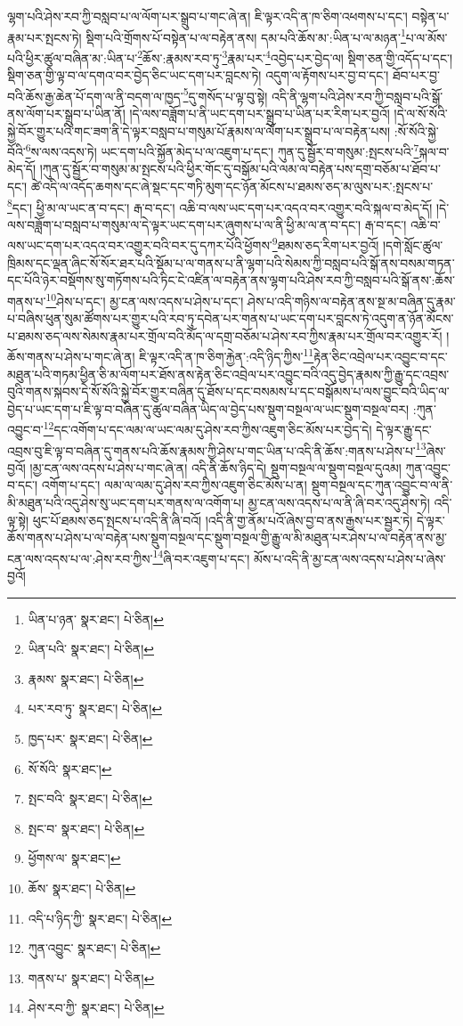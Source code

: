 ལྷག་པའི་ཤེས་རབ་ཀྱི་བསླབ་པ་ལ་ལོག་པར་སྒྲུབ་པ་གང་ཞེ་ན། ཇི་ལྟར་འདི་ན་ཁ་ཅིག་འཕགས་པ་དང་། བསྟེན་པ་རྣམ་པར་སྤངས་ཏེ། སྡིག་པའི་གྲོགས་པོ་བསྟེན་པ་ལ་བརྟེན་ནས། དམ་པའི་ཆོས་མ་:ཡིན་པ་ལ་མཉན་\footnote{ཡིན་པ་ཉན་  སྣར་ཐང་།  པེ་ཅིན། }པ་ལ་མོས་པའི་ཕྱིར་ཚུལ་བཞིན་མ་:ཡིན་པ་\footnote{ཡིན་པའི་  སྣར་ཐང་།  པེ་ཅིན། }ཆོས་:རྣམས་རབ་ཏུ་\footnote{རྣམས་  སྣར་ཐང་།  པེ་ཅིན། }རྣམ་པར་\footnote{པར་རབ་ཏུ་  སྣར་ཐང་།  པེ་ཅིན། }འབྱེད་པར་བྱེད་ལ། སྡིག་ཅན་གྱི་འདོད་པ་དང་། སྡིག་ཅན་གྱི་ལྟ་བ་ལ་དགའ་བར་བྱེད་ཅིང་ཡང་དག་པར་བླངས་ཏེ། འདུག་ལ་རྟོགས་པར་བྱ་བ་དང་། ཐོབ་པར་བྱ་བའི་ཆོས་རྒྱ་ཆེན་པོ་དག་ལ་ནི་བདག་ལ་ཁྱད་\footnote{ཁྱད་པར་  སྣར་ཐང་།  པེ་ཅིན། }དུ་གསོད་པ་ལྟ་བུ་སྟེ། འདི་ནི་ལྷག་པའི་ཤེས་རབ་ཀྱི་བསླབ་པའི་སྒོ་ནས་ལོག་པར་སྒྲུབ་པ་ཡིན་ནོ། །དེ་ལས་བཟློག་པ་ནི་ཡང་དག་པར་སྒྲུབ་པ་ཡིན་པར་རིག་པར་བྱའོ། །དེ་ལ་སོ་སོའི་སྐྱེ་བོར་གྱུར་པའི་གང་ཟག་ནི་དེ་ལྟར་བསླབ་པ་གསུམ་པོ་རྣམས་ལ་ལོག་པར་སྒྲུབ་པ་ལ་བརྟེན་པས། :སོ་སོའི་སྐྱེ་བོའི་\footnote{སོ་སོའི་  སྣར་ཐང་། }ས་ལས་འདས་ཏེ། ཡང་དག་པའི་སྐྱོན་མེད་པ་ལ་འཇུག་པ་དང་། ཀུན་དུ་སྦྱོར་བ་གསུམ་:སྤངས་པའི་\footnote{སྤང་བའི་  སྣར་ཐང་།  པེ་ཅིན། }སྐལ་བ་མེད་དོ། །ཀུན་དུ་སྦྱོར་བ་གསུམ་མ་སྤངས་པའི་ཕྱིར་གོང་དུ་བསྒོམ་པའི་ལམ་ལ་བརྟེན་པས་དགྲ་བཅོམ་པ་ཐོབ་པ་དང་། ཚེ་འདི་ལ་འདོད་ཆགས་དང་ཞེ་སྡང་དང་གཏི་མུག་དང་ཉོན་མོངས་པ་ཐམས་ཅད་མ་ལུས་པར་:སྤངས་པ་\footnote{སྤང་བ་  སྣར་ཐང་།  པེ་ཅིན། }དང་། ཕྱི་མ་ལ་ཡང་ན་བ་དང་། རྒ་བ་དང་། འཆི་བ་ལས་ཡང་དག་པར་འདའ་བར་འགྱུར་བའི་སྐལ་བ་མེད་དོ། །དེ་ལས་བཟློག་པ་བསླབ་པ་གསུམ་ལ་དེ་ལྟར་ཡང་དག་པར་ཞུགས་པ་ལ་ནི་ཕྱི་མ་ལ་ན་བ་དང་། རྒ་བ་དང་། འཆི་བ་ལས་ཡང་དག་པར་འདའ་བར་འགྱུར་བའི་བར་དུ་དཀར་པོའི་ཕྱོགས་\footnote{ཕྱོགས་ལ་  སྣར་ཐང་། }ཐམས་ཅད་རིག་པར་བྱའོ། །དགེ་སློང་ཚུལ་ཁྲིམས་དང་ལྡན་ཞིང་སོ་སོར་ཐར་པའི་སྡོམ་པ་ལ་གནས་པ་ནི་ལྷག་པའི་སེམས་ཀྱི་བསླབ་པའི་སྒོ་ནས་བསམ་གཏན་དང་པོའི་ཉེར་བསྡོགས་སུ་གཏོགས་པའི་ཏིང་ངེ་འཛིན་ལ་བརྟེན་ནས་ལྷག་པའི་ཤེས་རབ་ཀྱི་བསླབ་པའི་སྒོ་ནས་:ཆོས་གནས་པ་\footnote{ཆོས་  སྣར་ཐང་།  པེ་ཅིན། }ཤེས་པ་དང་། མྱ་ངན་ལས་འདས་པ་ཤེས་པ་དང་། ཤེས་པ་འདི་གཉིས་ལ་བརྟེན་ནས་སྔ་མ་བཞིན་དུ་རྣམ་པ་བཞིས་ཕུན་སུམ་ཚོགས་པར་གྱུར་པའི་རབ་ཏུ་དབེན་པར་གནས་པ་ཡང་དག་པར་བླངས་ཏེ་འདུག་ན་ཉོན་མོངས་པ་ཐམས་ཅད་ལས་སེམས་རྣམ་པར་གྲོལ་བའི་མོད་ལ་དགྲ་བཅོམ་པ་ཤེས་རབ་ཀྱིས་རྣམ་པར་གྲོལ་བར་འགྱུར་རོ། །ཆོས་གནས་པ་ཤེས་པ་གང་ཞེ་ན། ཇི་ལྟར་འདི་ན་ཁ་ཅིག་རྐྱེན་:འདི་ཉིད་ཀྱིས་\footnote{འདི་པ་ཉིད་ཀྱི་  སྣར་ཐང་།  པེ་ཅིན། }རྟེན་ཅིང་འབྲེལ་པར་འབྱུང་བ་དང་མཐུན་པའི་གཏམ་ཕྱིན་ཅི་མ་ལོག་པར་ཐོས་ནས་རྟེན་ཅིང་འབྲེལ་པར་འབྱུང་བའི་འདུ་བྱེད་རྣམས་ཀྱི་རྒྱུ་དང་འབྲས་བུའི་གནས་སྐབས་དེ་སོ་སོའི་སྐྱེ་བོར་གྱུར་བཞིན་དུ་ཐོས་པ་དང་བསམས་པ་དང་བསྒོམས་པ་ལས་བྱུང་བའི་ཡིད་ལ་བྱེད་པ་ཡང་དག་པ་ཇི་ལྟ་བ་བཞིན་དུ་ཚུལ་བཞིན་ཡིད་ལ་བྱེད་པས་སྡུག་བསྔལ་ལ་ཡང་སྡུག་བསྔལ་བར། :ཀུན་འབྱུང་བ་\footnote{ཀུན་འབྱུང་  སྣར་ཐང་།  པེ་ཅིན། }དང་འགོག་པ་དང་ལམ་ལ་ཡང་ལམ་དུ་ཤེས་རབ་ཀྱིས་འཇུག་ཅིང་མོས་པར་བྱེད་དེ། དེ་ལྟར་རྒྱུ་དང་འབྲས་བུ་ཇི་ལྟ་བ་བཞིན་དུ་གནས་པའི་ཆོས་རྣམས་ཀྱི་ཤེས་པ་གང་ཡིན་པ་འདི་ནི་ཆོས་:གནས་པ་ཤེས་པ་\footnote{གནས་པ་  སྣར་ཐང་།  པེ་ཅིན། }ཞེས་བྱའོ། །མྱ་ངན་ལས་འདས་པ་ཤེས་པ་གང་ཞེ་ན། འདི་ནི་ཆོས་ཉིད་དེ། སྡུག་བསྔལ་ལ་སྡུག་བསྔལ་དུའམ། ཀུན་འབྱུང་བ་དང་། འགོག་པ་དང་། ལམ་ལ་ལམ་དུ་ཤེས་རབ་ཀྱིས་འཇུག་ཅིང་མོས་པ་ན། སྡུག་བསྔལ་དང་ཀུན་འབྱུང་བ་ལ་ནི་མི་མཐུན་པའི་འདུ་ཤེས་སུ་ཡང་དག་པར་གནས་ལ་འགོག་པ། མྱ་ངན་ལས་འདས་པ་ལ་ནི་ཞི་བར་འདུ་ཤེས་ཏེ། འདི་ལྟ་སྟེ། ཕུང་པོ་ཐམས་ཅད་སྤངས་པ་འདི་ནི་ཞི་བའོ། །འདི་ནི་གྱ་ནོམ་པའོ་ཞེས་བྱ་བ་ནས་རྒྱས་པར་སྦྱར་ཏེ། དེ་ལྟར་ཆོས་གནས་པ་ཤེས་པ་ལ་བརྟེན་པས་སྡུག་བསྔལ་དང་སྡུག་བསྔལ་གྱི་རྒྱུ་ལ་མི་མཐུན་པར་ཤེས་པ་ལ་བརྟེན་ནས་མྱ་ངན་ལས་འདས་པ་ལ་:ཤེས་རབ་ཀྱིས་\footnote{ཤེས་རབ་ཀྱི་  སྣར་ཐང་།  པེ་ཅིན། }ཞི་བར་འཇུག་པ་དང་། མོས་པ་འདི་ནི་མྱ་ངན་ལས་འདས་པ་ཤེས་པ་ཞེས་བྱའོ། 